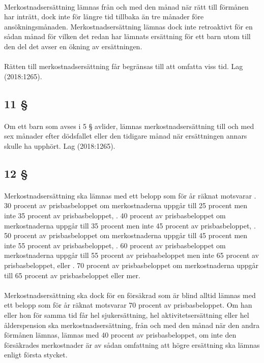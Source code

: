 \documentclass[a4paper,notitlepage,openany,10pt]{book}
\begin{document}
\paragraph*{}
Merkostnadsersättning lämnas från och med den månad när rätt till förmånen har inträtt, dock inte för längre tid tillbaka än tre månader före ansökningsmånaden. Merkostnadsersättning lämnas dock inte retroaktivt för en sådan månad för vilken det redan har lämnats ersättning för ett barn utom till den del det avser en ökning av ersättningen.
\paragraph*{}
Rätten till merkostnadsersättning får begränsas till att omfatta viss tid.
Lag (2018:1265).
\subsection*{11 §}
\paragraph*{}
Om ett barn som avses i 5 § avlider, lämnas merkostnadsersättning till och med sex månader efter dödsfallet eller den tidigare månad när ersättningen annars skulle ha upphört.
Lag (2018:1265).
\subsection*{12 §}
\paragraph*{}
Merkostnadsersättning ska lämnas med ett belopp som för år räknat motsvarar
. 30 procent av prisbasbeloppet om merkostnaderna uppgår till 25 procent men inte 35 procent av prisbasbeloppet,
. 40 procent av prisbasbeloppet om merkostnaderna uppgår till 35 procent men inte 45 procent av prisbasbeloppet,
. 50 procent av prisbasbeloppet om merkostnaderna uppgår till 45 procent men inte 55 procent av prisbasbeloppet,
. 60 procent av prisbasbeloppet om merkostnaderna uppgår till 55 procent av prisbasbeloppet men inte 65 procent av prisbasbeloppet, eller
. 70 procent av prisbasbeloppet om merkostnaderna uppgår till 65 procent av prisbasbeloppet eller mer.
\paragraph*{}
Merkostnadsersättning ska dock för en försäkrad som är blind alltid lämnas med ett belopp som för år räknat motsvarar 70 procent av prisbasbeloppet. Om han eller hon för samma tid får hel sjukersättning, hel aktivitetsersättning eller hel ålderspension ska merkostnadsersättning, från och med den månad när den andra förmånen lämnas, lämnas med 40 procent av prisbasbeloppet, om inte den försäkrades merkostnader är av sådan omfattning att högre ersättning ska lämnas enligt första stycket.
\end{document}
